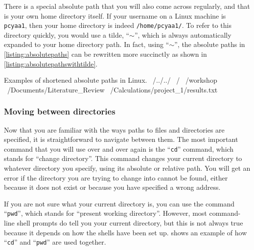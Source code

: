         There is a special absolute path that you will also come across regularly, and that is your own home directory itself.
        If your username on a Linux machine is \texttt{pcyaa1}, then your home directory is indeed \texttt{/home/pcyaa1/}.
        To refer to this directory quickly, you would use a tilde, \enquote{\texttt{\(\sim \)}}, which is always automatically expanded to your home directory path.
        In fact, using \enquote{\texttt{\(\sim \)}}, the absolute paths in \cref{listing:absolutepaths} can be rewritten more succinctly as shown in \cref{listing:absolutepathswithtilde}.
        \begin{bashoutput}[label=listing:absolutepathswithtilde]{Examples of shortened absolute paths in Linux.}
          ~/../../
          ~/
          ~/workshop
          ~/Documents/Literature_Review
          ~/Calculations/project_1/results.txt
        \end{bashoutput}

      \subsubsection{Moving between directories}
        Now that you are familiar with the ways paths to files and directories are specified, it is straightforward to navigate between them.
        The most important command that you will use over and over again is the \enquote{\texttt{cd}} command, which stands for \enquote{change directory}.
        This command changes your current directory to whatever directory you specify, using its absolute or relative path.
        You will get an error if the directory you are trying to change into cannot be found, either because it does not exist or because you have specified a wrong address.

        If you are not sure what your current directory is, you can use the command \enquote{\texttt{pwd}}, which stands for \enquote{present working directory}.
        However, most command-line shell prompts do tell you your current directory, but this is not always true because it depends on how the shells have been set up.
         shows an example of how \enquote{\texttt{cd}} and \enquote{\texttt{pwd}} are used together.



